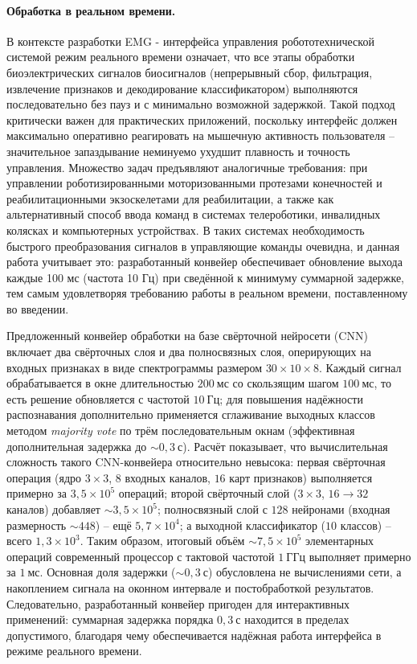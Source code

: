 \documentclass[12pt,a4paper]{article}
\begin{document}
\paragraph{Обработка в реальном времени.}

В контексте разработки EMG - интерфейса управления робототехнической системой режим реального времени означает, что все этапы обработки биоэлектрических сигналов биосигналов (непрерывный сбор, фильтрация, извлечение признаков и декодирование классификатором) выполняются последовательно без пауз и с минимально возможной задержкой. Такой подход критически важен для практических приложений, поскольку интерфейс должен максимально оперативно реагировать на мышечную активность пользователя – значительное запаздывание неминуемо ухудшит плавность и точность управления. Множество задач предъявляют аналогичные требования: при управлении роботизированными моторизованными протезами конечностей и реабилитационными экзоскелетами для реабилитации, а также как альтернативный способ ввода команд в системах телероботики, инвалидных колясках и компьютерных устройствах. В таких системах необходимость быстрого преобразования сигналов в управляющие команды очевидна, и данная работа учитывает это: разработанный конвейер обеспечивает обновление выхода каждые 100 мс (частота 10 Гц) при сведённой к минимуму суммарной задержке, тем самым удовлетворяя требованию работы в реальном времени, поставленному во введении.

\noindent
Предложенный конвейер обработки на базе свёрточной нейросети (CNN) включает два свёрточных слоя и два полносвязных слоя, оперирующих на входных признаках в виде спектрограммы размером \(30\times 10\times 8\). Каждый сигнал обрабатывается в окне длительностью \(200~\text{мс}\) со скользящим шагом \(100~\text{мс}\), то есть решение обновляется с частотой \(10~\text{Гц}\); для повышения надёжности распознавания дополнительно применяется сглаживание выходных классов методом \textit{majority vote} по трём последовательным окнам (эффективная дополнительная задержка до \(\sim 0{,}3~\text{с}\)). Расчёт показывает, что вычислительная сложность такого CNN-конвейера относительно невысока: первая свёрточная операция (ядро \(3\times 3\), \(8\) входных каналов, \(16\) карт признаков) выполняется примерно за \(3{,}5\times 10^{5}\) операций; второй свёрточный слой (\(3\times 3\), \(16\!\rightarrow\! 32\) каналов) добавляет \(\sim 3{,}5\times 10^{5}\); полносвязный слой с \(128\) нейронами (входная размерность \(\sim 448\)) – ещё \(5{,}7\times 10^{4}\); а выходной классификатор (\(10\) классов) – всего \(1{,}3\times 10^{3}\). Таким образом, итоговый объём \(\sim 7{,}5\times 10^{5}\) элементарных операций современный процессор с тактовой частотой \(1~\text{ГГц}\) выполняет примерно за \(1~\text{мс}\). Основная доля задержки (\(\sim 0{,}3~\text{с}\)) обусловлена не вычислениями сети, а накоплением сигнала на оконном интервале и постобработкой результатов. Следовательно, разработанный конвейер пригоден для интерактивных применений: суммарная задержка порядка \(0{,}3~\text{с}\) находится в пределах допустимого, благодаря чему обеспечивается надёжная работа интерфейса в режиме реального времени.
\end{document}
